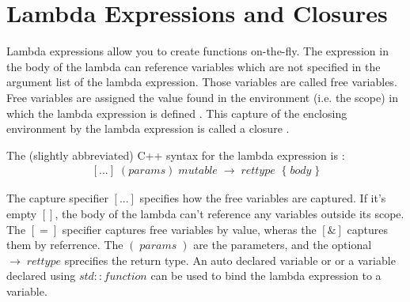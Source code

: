 \documentclass[12pt,fleqn]{article}
\begin{document}

\section*{Lambda Expressions and Closures}
Lambda expressions allow you to create functions on-the-fly. 
The expression in the body of the lambda can reference variables which are not specified in the argument list of the lambda expression. 
Those variables are called free variables. 
Free variables are assigned the value found in the environment (i.e. the scope) in which the lambda expression is defined \cite{field}. 
This capture of the enclosing environment by the lambda expression is called a closure \cite{field, scott}. 

The (slightly abbreviated) C++ syntax for the lambda expression is \cite{lambdaref}:
\[
\begin{array}{rll}
[...] \;  (params) \; mutable \;  \rightarrow \; rettype \;\; \{ \; body \;\}
\end{array}
\]

The capture specifier $[...]$ specifies how the free variables are captured.
If it's empty $[]$, the body of the lambda can't reference any variables outside its scope. 
The $[=]$ specifier captures free variables by value, wheras the $[\&]$ captures them by referrence. 
The $(\; params\;)$ are the parameters, and the optional $\rightarrow \; rettype$ sprecifies the return type. 
An auto \cite{auto} declared variable or or a variable declared using $std::function$ \cite{std::function} can be used to bind the lambda expression to a variable. 
\end{document}
